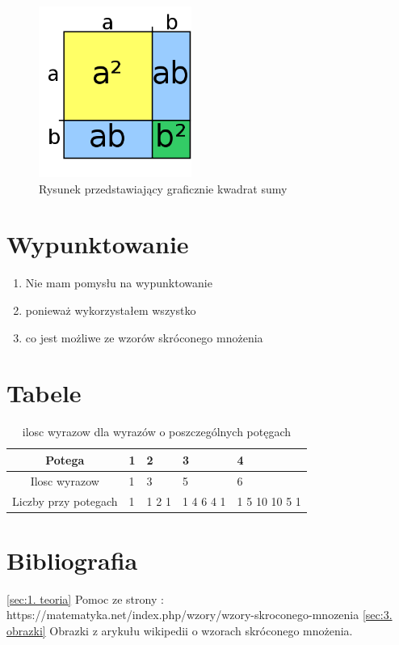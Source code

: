 \documentclass[11pt]{article}
\begin{document}
\begin{figure}[h]
\begin{center}
\includegraphics[width=5cm]{dd.png}
\caption{Rysunek przedstawiający graficznie kwadrat sumy}
\end{center}
\end{figure}
\newpage
\section{Wypunktowanie}
\begin{enumerate}
	\item Nie mam pomysłu na wypunktowanie
	\item ponieważ wykorzystałem wszystko
	\item co jest możliwe ze wzorów skróconego mnożenia
\end{enumerate}
\newpage
\section{Tabele}
\begin{table}[h]
\caption{ilosc wyrazow dla wyrazów o poszczególnych potęgach}
\begin{center}
\begin{tabular}{|c||l|l|l|l|}
\hline Potega & 1 & 2 & 3 & 4 \\ \hline \hline
Ilosc wyrazow & 1 & 3 & 5 & 6 \\ \hline
Liczby przy potegach & 1 & 1 2 1 & 1 4 6 4 1 & 1 5 10 10 5 1\\ \hline
\end{tabular}
\end{center}
\end{table}
\newpage
\section{Bibliografia}
\begin{thebibliography}{99}
\ref{sec:1. teoria} Pomoc ze strony :  https://matematyka.net/index.php/wzory/wzory-skroconego-mnozenia
\ref{sec:3. obrazki} Obrazki z arykułu wikipedii o wzorach skróconego mnożenia.
\end{thebibliography}
\end{document}
